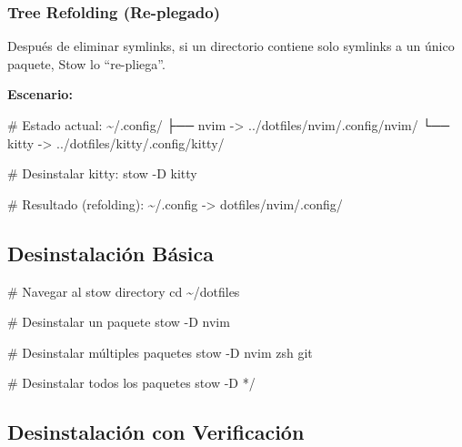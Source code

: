 \documentclass[
  doc,
  floatsintext,
  longtable,
  a4paper,
  nolmodern,
  notxfonts,
  notimes,
  12pt,
  colorlinks=true,linkcolor=blue,citecolor=blue,urlcolor=blue]{apa7}
\newenvironment{Shaded}{\begin{snugshade}}{\end{snugshade}}
\newcommand{\AttributeTok}[1]{\textcolor[rgb]{0.40,0.45,0.13}{#1}}
\newcommand{\BuiltInTok}[1]{\textcolor[rgb]{0.00,0.23,0.31}{#1}}
\newcommand{\CommentTok}[1]{\textcolor[rgb]{0.37,0.37,0.37}{#1}}
\newcommand{\ExtensionTok}[1]{\textcolor[rgb]{0.00,0.23,0.31}{#1}}
\newcommand{\NormalTok}[1]{\textcolor[rgb]{0.00,0.23,0.31}{#1}}
\newcommand{\OperatorTok}[1]{\textcolor[rgb]{0.37,0.37,0.37}{#1}}
\newcommand{\PreprocessorTok}[1]{\textcolor[rgb]{0.68,0.00,0.00}{#1}}
\begin{document}
\subsubsection{Tree Refolding
(Re-plegado)}\label{tree-refolding-re-plegado}

Después de eliminar symlinks, si un directorio contiene solo symlinks a
un único paquete, Stow lo ``re-pliega''.

\textbf{Escenario:}

\begin{Shaded}
\begin{Highlighting}[]
\CommentTok{\# Estado actual:}
\ExtensionTok{\textasciitilde{}/.config/}
  \ExtensionTok{├──}\NormalTok{ nvim }\AttributeTok{{-}}\OperatorTok{\textgreater{}}\NormalTok{ ../dotfiles/nvim/.config/nvim/}
  \ExtensionTok{└──}\NormalTok{ kitty }\AttributeTok{{-}}\OperatorTok{\textgreater{}}\NormalTok{ ../dotfiles/kitty/.config/kitty/}

\CommentTok{\# Desinstalar kitty:}
\ExtensionTok{stow} \AttributeTok{{-}D}\NormalTok{ kitty}

\CommentTok{\# Resultado (refolding):}
\ExtensionTok{\textasciitilde{}/.config} \AttributeTok{{-}}\OperatorTok{\textgreater{}}\NormalTok{ dotfiles/nvim/.config/}
\end{Highlighting}
\end{Shaded}

\subsection{Desinstalación Básica}\label{desinstalaciuxf3n-buxe1sica}

\begin{Shaded}
\begin{Highlighting}[]
\CommentTok{\# Navegar al stow directory}
\BuiltInTok{cd}\NormalTok{ \textasciitilde{}/dotfiles}

\CommentTok{\# Desinstalar un paquete}
\ExtensionTok{stow} \AttributeTok{{-}D}\NormalTok{ nvim}

\CommentTok{\# Desinstalar múltiples paquetes}
\ExtensionTok{stow} \AttributeTok{{-}D}\NormalTok{ nvim zsh git}

\CommentTok{\# Desinstalar todos los paquetes}
\ExtensionTok{stow} \AttributeTok{{-}D} \PreprocessorTok{*}\NormalTok{/}
\end{Highlighting}
\end{Shaded}

\subsection{Desinstalación con
Verificación}\label{desinstalaciuxf3n-con-verificaciuxf3n}
\end{document}
